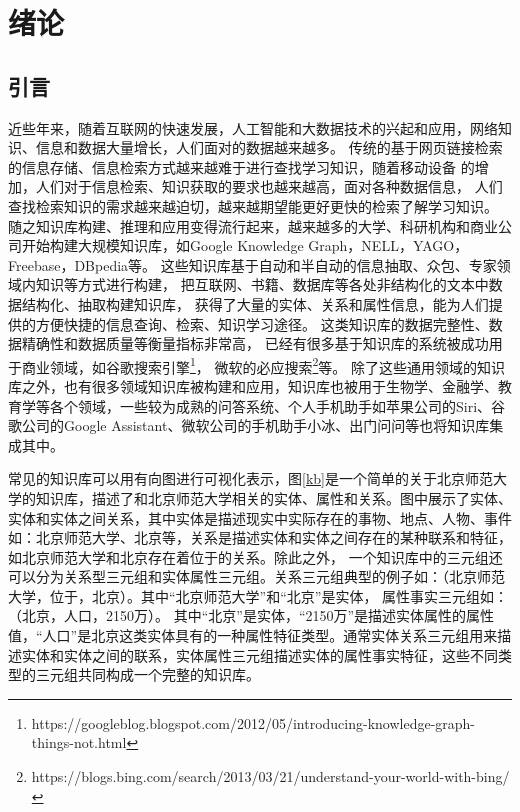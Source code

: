 

\chapter{绪论}
\label{cha:intro}
\section{引言}

近些年来，随着互联网的快速发展，人工智能和大数据技术的兴起和应用，网络知识、信息和数据大量增长，人们面对的数据越来越多。
传统的基于网页链接检索的信息存储、信息检索方式越来越难于进行查找学习知识，随着移动设备
的增加，人们对于信息检索、知识获取的要求也越来越高，面对各种数据信息，
人们查找检索知识的需求越来越迫切，越来越期望能更好更快的检索了解学习知识。
随之知识库构建、推理和应用变得流行起来，越来越多的大学、科研机构和商业公司开始构建大规模知识库，如Google Knowledge Graph\cite{Dong2014FromDF}，NELL\cite{NELL-aaai15}，YAGO\cite{Suchanek:2007:YCS:1242572.1242667}，
Freebase\cite{Bollacker2008FreebaseAC}，DBpedia\cite{Bizer:2009:DCP:1640541.1640848}等。
这些知识库基于自动和半自动的信息抽取、众包、专家领域内知识等方式进行构建，
把互联网、书籍、数据库等各处非结构化的文本中数据结构化、抽取构建知识库，
获得了大量的实体、关系和属性信息，能为人们提供的方便快捷的信息查询、检索、知识学习途径。
这类知识库的数据完整性、数据精确性和数据质量等衡量指标非常高，
已经有很多基于知识库的系统被成功用于商业领域，如谷歌搜索引擎\footnote{https://googleblog.blogspot.com/2012/05/introducing-knowledge-graph-things-not.html}，
微软的必应搜索\footnote{https://blogs.bing.com/search/2013/03/21/understand-your-world-with-bing/}等。
除了这些通用领域的知识库之外，也有很多领域知识库被构建和应用，知识库也被用于生物学\cite{Dumontier:2014:BRL:2878453.2878554}、金融学、教育学等各个领域，一些较为成熟的问答系统、个人手机助手如苹果公司的Siri、谷歌公司的Google Assistant、微软公司的手机助手小冰、出门问问等也将知识库集成其中。

常见的知识库可以用有向图进行可视化表示，图\ref{kb}是一个简单的关于北京师范大学的知识库，描述了和北京师范大学相关的实体、属性和关系。图中展示了实体、实体和实体之间关系，其中实体是描述现实中实际存在的事物、地点、人物、事件如：北京师范大学、北京等，关系是描述实体和实体之间存在的某种联系和特征，如北京师范大学和北京存在着位于的关系。除此之外，
一个知识库中的三元组还可以分为关系型三元组和实体属性三元组。关系三元组典型的例子如：（北京师范大学，位于，北京）。其中“北京师范大学”和“北京”是实体，
属性事实三元组如：（北京，人口，2150万）。
其中“北京”是实体，“2150万”是描述实体属性的属性值，“人口”是北京这类实体具有的一种属性特征类型。通常实体关系三元组用来描述实体和实体之间的联系，实体属性三元组描述实体的属性事实特征，这些不同类型的三元组共同构成一个完整的知识库。

